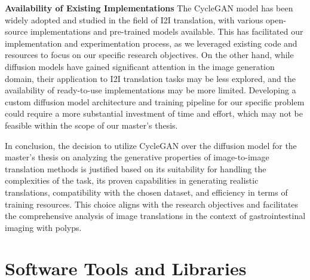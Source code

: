 \documentclass[UKenglish,12pt]{master-style}
\begin{document}
\textbf{Availability of Existing Implementations}
The CycleGAN model has been widely adopted and studied in the field of I2I translation, with various open-source implementations and pre-trained models available. This has facilitated our implementation and experimentation process, as we leveraged existing code and resources to focus on our specific research objectives.
On the other hand, while diffusion models have gained significant attention in the image generation domain, their application to I2I translation tasks may be less explored, and the availability of ready-to-use implementations may be more limited. Developing a custom diffusion model architecture and training pipeline for our specific problem could require a more substantial investment of time and effort, which may not be feasible within the scope of our master's thesis.

In conclusion, the decision to utilize CycleGAN over the diffusion model for the master's thesis on analyzing the generative properties of image-to-image translation methods is justified based on its suitability for handling the complexities of the task, its proven capabilities in generating realistic translations, compatibility with the chosen dataset, and efficiency in terms of training resources. This choice aligns with the research objectives and facilitates the comprehensive analysis of image translations in the context of gastrointestinal imaging with polyps.

\section{Software Tools and Libraries}
\end{document}
